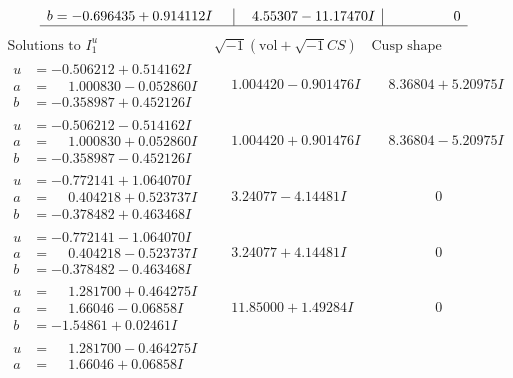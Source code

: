 \documentclass[1p]{elsarticle_modified}
\theoremstyle{definition}
\newcommand{\I}{\sqrt{-1}}
\begin{document}
$$\begin{array}{c|c|c}
\begin{aligned}
b &= -0.696435 + 0.914112 I\end{aligned}
 & \phantom{-}4.55307 - 11.17470 I & \phantom{-0.000000 } 0\\
 \hline 
 \end{array}$$\newpage$$\begin{array}{c|c|c}  
\text{Solutions to }I^u_{1}& \I (\text{vol} + \sqrt{-1}CS) & \text{Cusp shape}\\
 \hline 
\begin{aligned}
u &= -0.506212 + 0.514162 I \\
a &= \phantom{-}1.000830 - 0.052860 I \\
b &= -0.358987 + 0.452126 I\end{aligned}
 & \phantom{-}1.004420 - 0.901476 I & \phantom{-}8.36804 + 5.20975 I \\ \hline\begin{aligned}
u &= -0.506212 - 0.514162 I \\
a &= \phantom{-}1.000830 + 0.052860 I \\
b &= -0.358987 - 0.452126 I\end{aligned}
 & \phantom{-}1.004420 + 0.901476 I & \phantom{-}8.36804 - 5.20975 I \\ \hline\begin{aligned}
u &= -0.772141 + 1.064070 I \\
a &= \phantom{-}0.404218 + 0.523737 I \\
b &= -0.378482 + 0.463468 I\end{aligned}
 & \phantom{-}3.24077 - 4.14481 I & \phantom{-0.000000 } 0 \\ \hline\begin{aligned}
u &= -0.772141 - 1.064070 I \\
a &= \phantom{-}0.404218 - 0.523737 I \\
b &= -0.378482 - 0.463468 I\end{aligned}
 & \phantom{-}3.24077 + 4.14481 I & \phantom{-0.000000 } 0 \\ \hline\begin{aligned}
u &= \phantom{-}1.281700 + 0.464275 I \\
a &= \phantom{-}1.66046 - 0.06858 I \\
b &= -1.54861 + 0.02461 I\end{aligned}
 & \phantom{-}11.85000 + 1.49284 I & \phantom{-0.000000 } 0 \\ \hline\begin{aligned}
u &= \phantom{-}1.281700 - 0.464275 I \\
a &= \phantom{-}1.66046 + 0.06858 I \\

\end{aligned}
\end{array}$$
\end{document}

